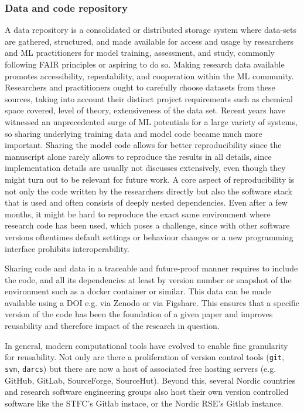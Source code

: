 \documentclass[9pt,bestpractices]{livecoms}
\begin{document}
\subsubsection{Data and code repository}
A data repository is a consolidated or distributed storage system where data-sets are gathered, structured, and made available for access and usage by researchers and ML practitioners for model training, assessment, and study, commonly following FAIR principles or aspiring to do so. Making research data available promotes accessibility, repeatability, and cooperation within the ML community. Researchers and practitioners ought to carefully choose datasets from these sources, taking into account their distinct project requirements such as chemical space covered, level of theory, extensiveness of the data set. Recent years have witnessed an unprecedented surge of ML potentials for a large variety of systems, so sharing underlying training data and model code became much more important. Sharing the model code allows for better reproducibility since the manuscript alone rarely allows to reproduce the results in all details, since implementation details are usually not discusses extensively, even though they might turn out to be relevant for future work. A core aspect of reproducibility is not only the code written by the researchers directly but also the software stack that is used and often consists of deeply nested dependencies. Even after a few months, it might be hard to reproduce the exact same environment where research code has been used, which poses a challenge, since with other software versions oftentimes default settings or behaviour changes or a new programming interface prohibits interoperability.

Sharing code and data in a traceable and future-proof manner requires to include the code, and all its dependencies at least by version number or snapshot of the environment such as a docker container or similar. This data can be made available using a DOI e.g. via Zenodo or via Figshare. This ensures that a specific version of the code has been the foundation of a given paper and improves reusability and therefore impact of the research in question.

In general, modern computational tools have evolved to enable fine granularity for reusability. Not only are there a proliferation of version control tools (\texttt{git}, \texttt{svn}, \texttt{darcs}) but there are now a host of associated free hosting servers (e.g. GitHub, GitLab, SourceForge, SourceHut). Beyond this, several Nordic countries and research software engineering groups also host their own version controlled software like the STFC's Gitlab instace, or the Nordic RSE's Gitlab instance.
\end{document}

